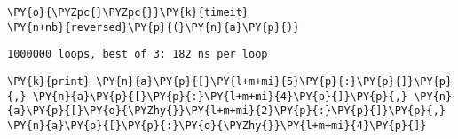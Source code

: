 {\par%
\vspace{-1\baselineskip}%
}%
\begin{notebookcell}[65]%
\begin{addmargin}[\cellleftmargin]{0em}%
{\smaller%
\par%
%
\vspace{-1\smallerfontscale}%
\begin{Verbatim}[commandchars=\\\{\}]
\PY{o}{\PYZpc{}\PYZpc{}}\PY{k}{timeit}
\PY{n+nb}{reversed}\PY{p}{(}\PY{n}{a}\PY{p}{)}
\end{Verbatim}
%
\par%
\vspace{-1\smallerfontscale}}%
\end{addmargin}
\end{notebookcell}

\par\vspace{1\smallerfontscale}%
    \begin{addmargin}[\cellleftmargin]{0em}%
    {\smaller%
    \vspace{-1\smallerfontscale}%
    
    \begin{Verbatim}[commandchars=\\\{\}]
1000000 loops, best of 3: 182 ns per loop
    \end{Verbatim}
}%
    \end{addmargin}%

{\par%
\vspace{-1\baselineskip}%
}%
\begin{notebookcell}[66]%
\begin{addmargin}[\cellleftmargin]{0em}%
{\smaller%
\par%
%
\vspace{-1\smallerfontscale}%
\begin{Verbatim}[commandchars=\\\{\}]
\PY{k}{print} \PY{n}{a}\PY{p}{[}\PY{l+m+mi}{5}\PY{p}{:}\PY{p}{]}\PY{p}{,} \PY{n}{a}\PY{p}{[}\PY{p}{:}\PY{l+m+mi}{4}\PY{p}{]}\PY{p}{,} \PY{n}{a}\PY{p}{[}\PY{o}{\PYZhy{}}\PY{l+m+mi}{2}\PY{p}{:}\PY{p}{]}\PY{p}{,} \PY{n}{a}\PY{p}{[}\PY{p}{:}\PY{o}{\PYZhy{}}\PY{l+m+mi}{4}\PY{p}{]}
\end{Verbatim}
%
\par%
\vspace{-1\smallerfontscale}}%
\end{addmargin}
\end{notebookcell}

